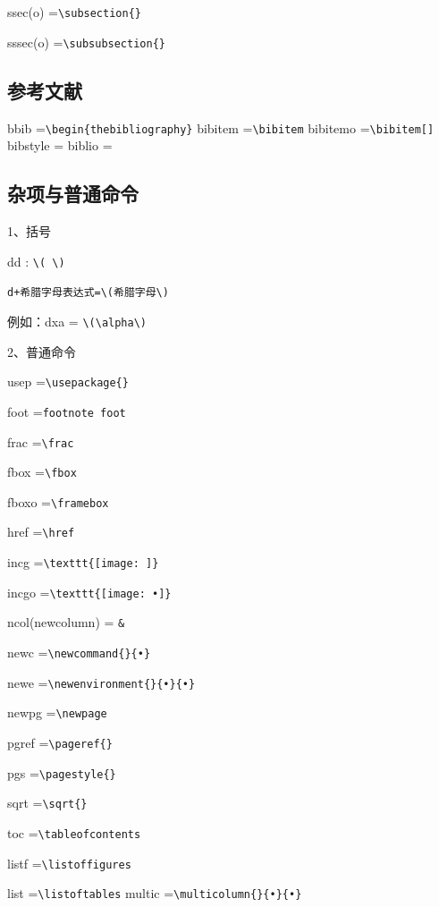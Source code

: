 ssec(o)  =\verb|\subsection{}|

sssec(o) =\verb|\subsubsection{}|

 
\subsection{参考文献}
bbib      =\verb|\begin{thebibliography}|
bibitem   =\verb|\bibitem|
bibitemo  =\verb|\bibitem[]|
bibstyle   =\verb||
biblio     =\verb||
 
  
 \subsection{杂项与普通命令}
1、括号

dd : \verb|\( \)|

\verb|d+希腊字母表达式=\(希腊字母\)|

例如：dxa = \verb|\(\alpha\)|
 
2、普通命令

usep   =\verb|\usepackage{}|

foot    =\verb|footnote foot|

frac    =\verb|\frac|

fbox   =\verb|\fbox|

fboxo  =\verb|\framebox|

href   =\verb|\href|

incg   =\verb|\texttt{[image: ]}|

incgo  =\verb|\texttt{[image: •]}|

ncol(newcolumn) = \verb|&|

newc  =\verb|\newcommand{}{•}|

newe  =\verb|\newenvironment{}{•}{•}|

newpg =\verb|\newpage|

pgref  =\verb|\pageref{}|

pgs   =\verb|\pagestyle{}|

sqrt   =\verb|\sqrt{}|

toc   =\verb|\tableofcontents|

listf   =\verb|\listoffigures|

list   =\verb|\listoftables|
multic =\verb|\multicolumn{}{•}{•}|



